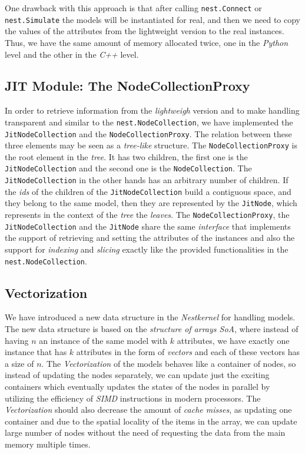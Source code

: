 One drawback with this approach is that after calling \texttt{nest.Connect} or \texttt{nest.Simulate} the models will be instantiated for real, and then we need to copy the values of the attributes from the lightweight version to the real instances. Thus, we have the same amount of memory allocated twice, one in the \emph{Python} level and the other in the \emph{C++} level.

\subsection*{JIT Module: The NodeCollectionProxy}

In order to retrieve information from the \emph{lightweigh} version and to make handling transparent and similar to the \texttt{nest.NodeCollection}, we have implemented the \texttt{JitNodeCollection} and the \texttt{NodeCollectionProxy}. The relation between these three elements may be seen as a \emph{tree-like} structure. The \texttt{NodeCollectionProxy} is the root element in the \emph{tree}. It has two children, the first one is the \texttt{JitNodeCollection} and the second one is the \texttt{NodeCollection}. The \texttt{JitNodeCollection} in the other hands has an arbitrary  number of children. If the \emph{ids} of the children of the \texttt{JitNodeCollection} build a contiguous space, and they belong to the same model, then they are represented by the \texttt{JitNode}, which represents in the context of the \emph{tree} the \emph{leaves}. The \texttt{NodeCollectionProxy}, the \texttt{JitNodeCollection} and the \texttt{JitNode} share the same \emph{interface} that implements the support of retrieving and setting the attributes of the instances and also the support for \emph{indexing} and \emph{slicing} exactly like the provided functionalities in the \texttt{nest.NodeCollection}.

\subsection*{Vectorization}

We have introduced a new data structure in the \emph{Nestkernel} for handling models. The new data structure is based on the \emph{structure of arrays SoA}, where instead of having $n$ an instance of the same model with $k$ attributes, we have exactly one instance  that has $k$ attributes in the form of \emph{vectors} and each of these vectors has a size of $n$. The \emph{Vectorization} of the models behaves like a container of nodes, so instead of updating the nodes separately, we can update just the exciting containers which eventually updates the states of the nodes in parallel by utilizing the efficiency of \emph{SIMD} instructions in modern processors. The \emph{Vectorization} should also decrease the amount of \emph{cache misses}, as  updating one container and due to the spatial locality of the items in the array, we can update large number of nodes without the need of requesting the data from the main memory multiple times.


